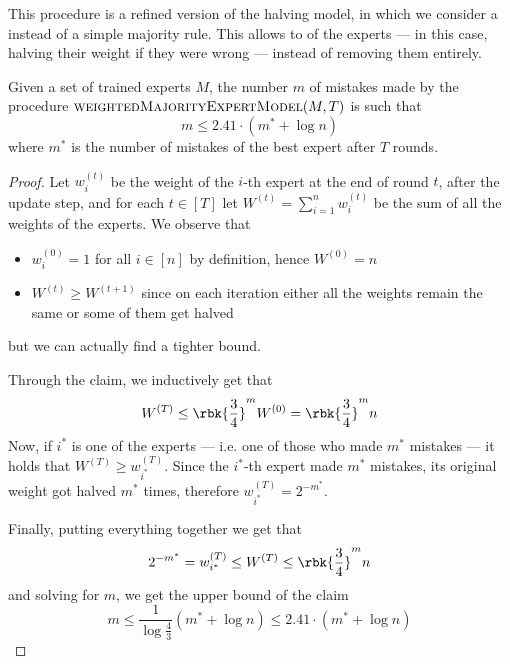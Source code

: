 \documentclass[a4paper, 12pt]{report}
\begin{document}
    This procedure is a refined version of the halving model, in which we consider a  instead of a simple majority rule. This allows to  of the experts --- in this case, halving their weight if they were wrong --- instead of removing them entirely.

    \begin{framedthm}{}
        Given a set of trained experts $M$, the number $m$ of mistakes made by the procedure $\textsc{weightedMajorityExpertModel}(M, T)$ is such that $$m \le 2.41 \cdot (m^* + \log n)$$ where $m^*$ is the number of mistakes of the best expert after $T$ rounds.
    \end{framedthm}

    \begin{proof}
        Let $w^{(t)}_i$ be the weight of the $i$-th expert at the end of round $t$, after the update step, and for each $t \in [T]$ let $W^{(t)} = \sum_{i = 1}^{n}{w_i^{(t)}}$ be the sum of all the weights of the experts. We observe that
        
        \begin{itemize}
            \item $w_i^{(0)} = 1$ for all $i \in [n]$ by definition, hence $W^{(0)} = n$
            \item $W^{(t)} \ge W^{(t + 1)}$ since on each iteration either all the weights remain the same or some of them get halved
        \end{itemize}

        but we can actually find a tighter bound.


        Through the claim, we inductively get that $$W^{(T)} \le \rbk{\dfrac{3}{4}}^m W^{(0)} = \rbk{\dfrac{3}{4}}^m n$$ Now, if $i^*$ is one of the  experts --- i.e. one of those who made $m^*$ mistakes --- it holds that $W^{(T)} \ge w_{i^*}^{(T)}$. Since the $i^*$-th expert made $m^*$ mistakes, its original weight got halved $m^*$ times, therefore $w_{i^*}^{(T)} = 2^{-m^*}$.

        Finally, putting everything together we get that $$2^{-m^*} = w_{i^*}^{(T)} \le W^{(T)} \le \rbk{\dfrac{3}{4}}^m n$$ and solving for $m$, we get the upper bound of the claim $$m \le \dfrac{1}{\log \tfrac{4}{3}} (m^* + \log n) \le 2.41 \cdot (m^* + \log n)$$
    \end{proof}
\end{document}

